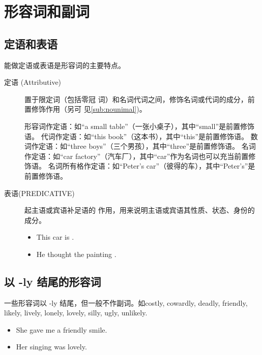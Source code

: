 \section{形容词和副词}

\subsection{定语和表语}
\label{sub:attrpred}

能做定语或表语是形容词的主要特点。

\begin{description}
\item[定语 (Attributive)] 置于限定词（包括零冠
  词）和名词代词之间，修饰名词或代词的成分，前置修饰作用（另可
  见\cref{sub:nounimal})。
  \begin{itemize}
    形容词作定语：如“a small table”（一张小桌子），其中“small”是前置修饰语。
    代词作定语：如“this book”（这本书），其中“this”是前置修饰语。
    数词作定语：如“three boys”（三个男孩），其中“three”是前置修饰语。
    名词作定语：如“car factory”（汽车厂），其中“car”作为名词也可以充当前置修饰语。
    名词所有格作定语：如“Peter’s car”（彼得的车），其中“Peter’s”是前置修饰语。
  \end{itemize}

\item[表语(PREDICATIVE)]  起主语或宾语补足语的
  作用，用来说明主语或宾语其性质、状态、身份的成分。
  \begin{itemize}
  \item This car is .

  \item He thought the painting .
  \end{itemize}
\end{description}

\subsection{以 -ly 结尾的形容词}

一些形容词以 -ly 结尾，但一般不作副词。如costly, cowardly, deadly, friendly,
likely, lively, lonely, lovely, silly, ugly, unlikely.
\begin{itemize}
\item She gave me a friendly smile.

\item Her singing was lovely.
\end{itemize}

